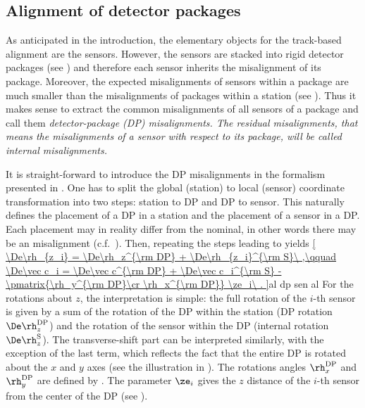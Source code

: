 \subsection[al rp fac]{Alignment of detector packages}

As anticipated in the introduction, the elementary objects for the track-based alignment are the sensors. However, the sensors are stacked into rigid detector packages (see ) and therefore each sensor inherits the misalignment of its package. Moreover, the expected misalignments of sensors within a package are much smaller than the misalignments of packages within a station (see ). Thus it makes sense to extract the common misalignments of all sensors of a package and call them \em{detector-package (DP) misalignments}. The residual misalignments, that means the misalignments of a sensor with respect to its package, will be called \em{internal misalignments}.

It is straight-forward to introduce the DP misalignments in the formalism presented in . One has to split the global (station) to local (sensor) coordinate transformation  into two steps: station to DP and DP to sensor. This naturally defines the placement of a DP in a station and the placement of a sensor in a DP. Each placement may in reality differ from the nominal, in other words there may be an misalignment (c.f.~). Then, repeating the steps leading to  yields
\eqref{
	\De\rh_{z_i} = \De\rh_z^{\rm DP} + \De\rh_{z_i}^{\rm S}\ ,\qquad
	\De\vec c_i = \De\vec c^{\rm DP} + \De\vec c_i^{\rm S} - \pmatrix{\rh_y^{\rm DP}\cr \rh_x^{\rm DP}} \ze_i\ .
}{al dp sen al}
For the rotations about $z$, the interpretation is simple: the full rotation of the $i$-th sensor is given by a sum of the rotation of the DP within the station (DP rotation $\De\rh_z^{\rm DP}$) and the rotation of the sensor within the DP (internal rotation $\De\rh_z^{\rm S}$). The transverse-shift part can be interpreted similarly, with the exception of the last term, which reflects the fact that the entire DP is rotated about the $x$ and $y$ axes (see the illustration in ). The rotations angles $\rh_x^{\rm DP}$ and $\rh_y^{\rm DP}$ are defined by . The parameter $\ze_i$ gives the $z$ distance of the $i$-th sensor from the center of the DP (see ).


